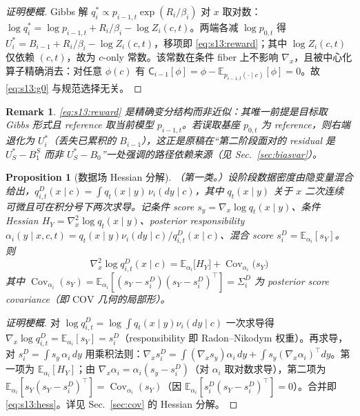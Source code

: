 \documentclass[11pt,a4paper]{article}
\newtheorem{proposition}[theorem]{Proposition}
\newtheorem{remark}[theorem]{Remark}
\DeclareMathOperator{\Cov}{Cov}
\newcommand{\E}{\mathbb{E}}
\newcommand{\Center}{\mathsf{C}}    %
\newcommand{\COV}{\mathrm{COV}}     %
\begin{document}
\begin{proof}[证明梗概]
Gibbs 解 $q_i^*\propto p_{i-1,t}\exp(R_i/\beta_i)$ 对 $x$ 取对数：$\log q_i^*=\log p_{i-1,t}+R_i/\beta_i-\log Z_i(c,t)$。两端各减 $\log p_{0,t}$ 得 $U_i^*=B_{i-1}+R_i/\beta_i-\log Z_i(c,t)$，移项即 \eqref{eq:s13:reward}；其中 $\log Z_i(c,t)$ 仅依赖 $(c,t)$，故为 $c$-only 常数。该常数在条件 fiber 上不影响 $\nabla_x$，且被中心化算子精确消去：对任意 $\phi(c)$ 有 $\Center_{i-1}[\phi]=\phi-\E_{p_{i-1,t}(\cdot\mid c)}[\phi]=0$。故 \eqref{eq:s13:g0} 与规范选择无关。
\end{proof}

\begin{remark}\label{rem:s13:gibbs}
\eqref{eq:s13:reward} 是\emph{精确}变分结构而非近似：其唯一前提是目标取 Gibbs 形式且 reference 取当前模型 $p_{i-1,t}$。若误取基座 $p_{0,t}$ 为 reference，则右端退化为 $U_i^*$（丢失已累积的 $B_{i-1}$），这正是原稿在“第二阶段面对的 residual 是 $U_S^*-B_1^S$ 而非 $U_S^*-B_0$”一处强调的路径依赖来源（见 Sec.~\ref{sec:biasvar}）。
\end{remark}

\begin{proposition}[数据场 Hessian 分解]\label{prop:s13:hess}
（第一类。）设阶段数据密度由隐变量混合给出，$q_{i,t}^D(x\mid c)=\int q_t(x\mid y)\,\nu_i(dy\mid c)$，其中 $q_t(x\mid y)$ 关于 $x$ 二次连续可微且可在积分号下两次求导。记条件 score $s_y=\nabla_x\log q_t(x\mid y)$、条件 Hessian $H_Y=\nabla_x^2\log q_t(x\mid y)$、posterior responsibility $\alpha_i(y\mid x,c,t)=q_t(x\mid y)\nu_i(dy\mid c)/q_{i,t}^D(x\mid c)$、混合 score $s_i^D=\E_{\alpha_i}[s_Y]$。则
\begin{equation}\label{eq:s13:hess}
\boxed{\,\nabla_x^2\log q_{i,t}^D(x\mid c)=\E_{\alpha_i}\!\big[H_Y\big]+\Cov_{\alpha_i}\!\big(s_Y\big)\,}
\end{equation}
其中 $\Cov_{\alpha_i}(s_Y)=\E_{\alpha_i}[(s_Y-s_i^D)(s_Y-s_i^D)^\top]=\Sigma_i^D$ 为 posterior score covariance（即 $\COV$ 几何的局部形）。
\end{proposition}

\begin{proof}[证明梗概]
对 $\log q_{i,t}^D=\log\int q_t(x\mid y)\nu_i(dy\mid c)$ 一次求导得 $\nabla_x\log q_{i,t}^D=\E_{\alpha_i}[s_Y]=s_i^D$（responsibility 即 Radon--Nikodym 权重）。再求导，对 $s_i^D=\int s_y\,\alpha_i\,dy$ 用乘积法则：$\nabla_x s_i^D=\int(\nabla_x s_y)\alpha_i\,dy+\int s_y(\nabla_x\alpha_i)^\top dy$。第一项为 $\E_{\alpha_i}[H_Y]$；由 $\nabla_x\alpha_i=\alpha_i(s_y-s_i^D)$（对 $\alpha_i$ 取对数求导），第二项为 $\E_{\alpha_i}[s_Y(s_Y-s_i^D)^\top]=\Cov_{\alpha_i}(s_Y)$（因 $\E_{\alpha_i}[s_i^D(s_Y-s_i^D)^\top]=0$）。合并即 \eqref{eq:s13:hess}。详见 Sec.~\ref{sec:cov} 的 Hessian 分解。
\end{proof}
\end{document}
